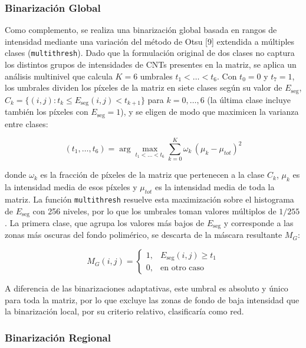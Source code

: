 \subsubsection{Binarización Global}

Como complemento, se realiza una binarización global basada en rangos de intensidad mediante una variación del método de Otsu [9] extendida a múltiples clases (\texttt{multithresh}). Dado que la formulación original de dos clases no captura los distintos grupos de intensidades de CNTs presentes en la matriz, se aplica un análisis multinivel que calcula $K = 6$ umbrales $t_1 < \dots < t_6$. Con $t_0 = 0$ y $t_7 = 1$, los umbrales dividen los píxeles de la matriz en siete clases según su valor de $E_{\mathrm{seg}}$, $C_k = \{(i,j) : t_k \le E_{\mathrm{seg}}(i,j) < t_{k+1}\}$ para $k = 0, \dots, 6$ (la última clase incluye también los píxeles con $E_{\mathrm{seg}} = 1$), y se eligen de modo que maximicen la varianza entre clases:

\begin{equation}
(t_1, \dots, t_6) = \arg\max_{t_1 < \dots < t_6} \sum_{k=0}^{K} \omega_k\,(\mu_k - \mu_{tot})^2
\label{eq:otsu}
\end{equation}

donde $\omega_k$ es la fracción de píxeles de la matriz que pertenecen a la clase $C_k$, $\mu_k$ es la intensidad media de esos píxeles y $\mu_{tot}$ es la intensidad media de toda la matriz. La función \texttt{multithresh} resuelve esta maximización sobre el histograma de $E_{\mathrm{seg}}$ con 256 niveles, por lo que los umbrales toman valores múltiplos de $1/255$. La primera clase, que agrupa los valores más bajos de $E_{\mathrm{seg}}$ y corresponde a las zonas más oscuras del fondo polimérico, se descarta de la máscara resultante $M_G$:

\begin{equation}
M_G(i,j) = \begin{cases} 1, & E_{\mathrm{seg}}(i,j) \ge t_1 \\ 0, & \text{en otro caso} \end{cases}
\label{eq:bin_global}
\end{equation}

A diferencia de las binarizaciones adaptativas, este umbral es absoluto y único para toda la matriz, por lo que excluye las zonas de fondo de baja intensidad que la binarización local, por su criterio relativo, clasificaría como red.

\subsubsection{Binarización Regional}

